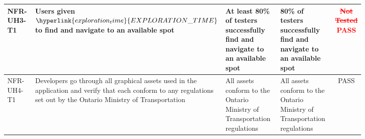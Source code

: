 \documentclass[12pt, titlepage]{article}
\begin{document}
\begin{center}
\begin{tabular}{|p{0.10\linewidth}|p{0.35\linewidth}|p{0.20\linewidth}|p{0.20\linewidth}|c|} 
\hline
NFR-UH3-T1 & Users given $\hyperlink{exploration_time}{EXPLORATION\_TIME}$ to
find and navigate to an available spot & At least 80\% of testers successfully
find and navigate to an available spot & 80\% of testers successfully find and
navigate to an available spot & \textcolor{red}{\st{Not Tested} PASS}\\
\hline 
NFR-UH4-T1 & Developers go through all graphical assets used in the application
and verify that each conform to any regulations set out by the Ontario Ministry
of Transportation & All assets conform to the Ontario Ministry of Transportation
regulations & All assets conform to the Ontario Ministry of Transportation
regulations & \textcolor{OliveGreen}{PASS}\\
\hline 
\end{tabular}
\end{center}
		
\end{document}
